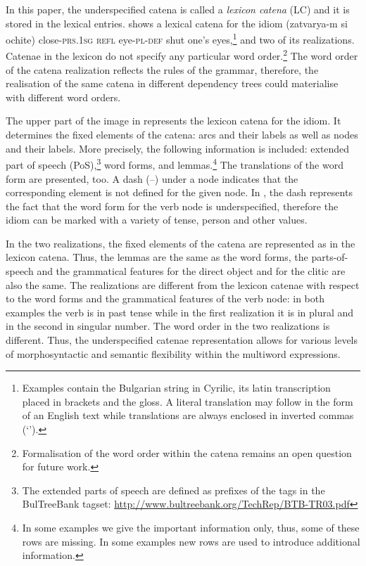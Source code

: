 \documentclass[output=paper]{langsci/langscibook}
\begin{document}
\newpage 
In this paper, the underspecified catena is called a 
\emph{lexicon catena} (LC)  
and it is stored in the lexical entries.
 shows a lexical catena for the idiom 
 \textit{} (zatvarya-m si ochite) close-\textsc{prs.1sg} \textsc{refl} eye-\textsc{pl-def} shut one's eyes,\footnote{Examples contain the Bulgarian string in Cyrilic, its latin transcription placed in brackets and the gloss. A literal translation may follow in the form of an English text while translations are always enclosed in inverted commas (`').}  and two of its realizations. Catenae in the lexicon do not
specify any particular word order.\footnote{Formalisation of the word order
within the catena remains an open question for future work.} The word order of the catena realization reflects the rules of the grammar, therefore, the realisation of the same catena in different dependency trees could materialise with different word orders.

The upper part of the image in  represents the lexicon catena for the idiom. It determines the fixed elements of the catena: arcs and their labels as well as nodes and their labels. More precisely, the following information is included: extended part of speech (PoS),\footnote{The extended parts of speech are defined as prefixes of the tags in the BulTreeBank tagset: \url{http://www.bultreebank.org/TechRep/BTB-TR03.pdf}} word forms, and lemmas.\footnote{In some examples we give the important information only, thus, some of these rows are missing. In some examples new rows are used to introduce additional information.} The translations of the word form are presented, too. A dash (--) under a node indicates that the corresponding element is not defined for the given node. In , the dash represents the fact that the word form for the verb node is underspecified, therefore the idiom can be marked with a variety of tense, person and other values.

In the two realizations, the fixed elements of the catena are represented as
in the  lexicon catena. Thus, the lemmas are the same as the word forms, the
parts-of-speech and the grammatical features for the direct object and for
the clitic are also the same. The realizations are different from the lexicon
catenae with respect to the word forms and the grammatical features of the
verb node: in both examples the verb is in past tense while in the first
realization it is in plural and in the second in singular number. The word
order in the two realizations is different. Thus, the underspecified catenae
representation allows for various levels of morphosyntactic and semantic
flexibility within the multiword expressions.
\end{document}

